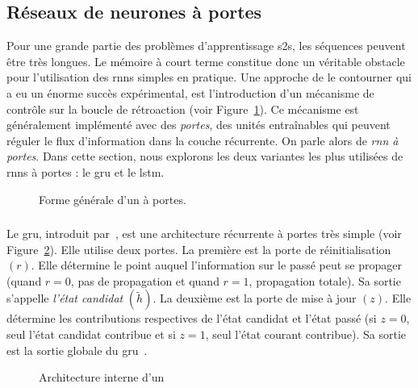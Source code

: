 \subsection{Réseaux de neurones à portes}

Pour une grande partie des problèmes d'apprentissage \gls{s2s}, les séquences peuvent être très longues.
Le mémoire à court terme constitue donc un véritable obstacle pour l'utilisation des \glspl{rnn} simples en pratique.
Une approche de le contourner qui a eu un énorme succès expérimental, 
est l'introduction d'un mécanisme de contrôle sur la boucle de rétroaction (voir Figure~\ref{fig.rnn-gate}).
Ce mécanisme est généralement implémenté avec des \emph{portes},
des unités entraînables qui peuvent réguler le flux d'information dans la couche récurrente.
On parle alors de \emph{\gls{rnn} à portes}.
Dans cette section, nous explorons les deux variantes les plus utilisées de \glspl{rnn} à portes :
le \gls{gru} et le \gls{lstm}. 


\begin{figure}[htb]
    \centering
    \resizebox{8cm}{!}{}
    \caption{Forme générale d'un  à portes.}
    \label{fig.rnn-gate}
\end{figure}

\subsubsection{}

Le \gls{gru}, introduit par~\cite{Cho_van_Merrienboer_Bahdanau_Bengio_2014}, 
est une architecture récurrente à portes très simple (voir Figure~\ref{fig.gru-circuit}).
Elle utilise deux portes.
La première est la porte de réinitialisation \((r)\).
Elle détermine le point auquel l'information sur le passé peut se propager
(quand \(r=0\), pas de propagation et quand \(r=1\), propagation totale).
Sa sortie s'appelle \emph{l'état candidat} \((\tilde{h})\).
La deuxième est la porte de mise à jour \((z)\).
Elle détermine les contributions respectives de l'état candidat et l'état passé
(si \(z=0\), seul l'état candidat contribue et si \(z=1\), seul l'état courant contribue).
Sa sortie est la sortie globale du \gls{gru}~\cite{Cho_van_Merrienboer_Bahdanau_Bengio_2014}.


\begin{figure}[htb]
    \centering
    \resizebox{8cm}{!}{}
    \caption[Architecture interne d'un ]%
    {Architecture interne d'un ~\cite{Chung_Gulcehre_Cho_Bengio_2014}}
    \label{fig.gru-circuit}
\end{figure}

